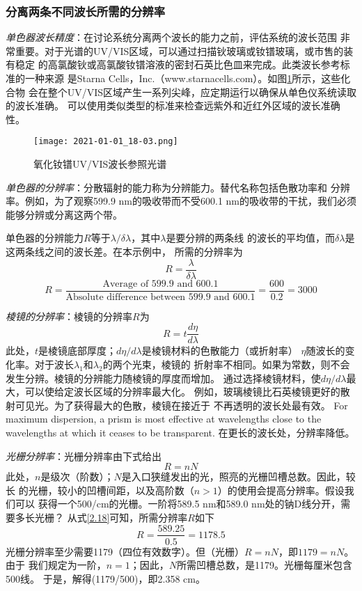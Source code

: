\subsubsection{分离两条不同波长所需的分辨率}
\emph{单色器波长精度}：在讨论系统分离两个波长的能力之前，评估系统的波长范围
非常重要。对于光谱的UV/VIS区域，可以通过扫描钬玻璃或钕镨玻璃，或市售的装有稳定
的高氯酸钬或高氯酸钕镨溶液的密封石英比色皿来完成。此类波长参考标准的一种来源
是Starna Cells，Inc.（www.starnacells.com）。如图\ref{fig:2.24}所示，这些化合物
会在整个UV/VIS区域产生一系列尖峰，应定期运行以确保从单色仪系统读取的波长准确。
可以使用类似类型的标准来检查远紫外和近红外区域的波长准确性。
\begin{figure}[htpb]
    \centering
    \texttt{[image: 2021-01-01\_18-03.png]}
    \caption{氧化钕镨UV/VIS波长参照光谱}
    \label{fig:2.24}
\end{figure}

\emph{单色器的分辨率}：分散辐射的能力称为分辨能力。替代名称包括色散功率和
分辨率。例如，为了观察599.9 nm的吸收带而不受600.1 nm的吸收带的干扰，我们必须
能够分辨或分离这两个带。

单色器的分辨能力$R$等于$\lambda /\delta\lambda$，其中$\lambda$是要分辨的两条线
的波长的平均值，而$\delta \lambda$是这两条线之间的波长差。在本示例中，
所需的分辨率为
\begin{equation}
    R=\frac{\lambda}{\delta\lambda}
    \label{2.18}
\end{equation}
\[
    R=\frac{\text{Average of 599.9 and 600.1}}
    {\text{Absolute difference between 599.9 and 600.1}}
    =\frac{600}{0.2}=3000
\]

\emph{棱镜的分辨率}：棱镜的分辨率$R$为
\begin{equation}
    R = t\frac{d\eta}{d\lambda}
    \label{2.19}
\end{equation}
此处，$t$是棱镜底部厚度；$d\eta/d\lambda$是棱镜材料的色散能力（或折射率）
$\eta$随波长的变化率。对于波长$\lambda_1$和$\lambda_2$的两个光束，棱镜的
折射率不相同。如果为常数，则不会发生分辨。棱镜的分辨能力随棱镜的厚度而增加。
通过选择棱镜材料，使$d\eta/d\lambda$最大，可以使给定波长区域的分辨率最大化。
例如，玻璃棱镜比石英棱镜更好的散射可见光。为了获得最大的色散，棱镜在接近于
不再透明的波长处最有效。
For maximum dispersion, a prism is most effective at wavelengths close to
the wavelengths at which it ceases to be transparent.
在更长的波长处，分辨率降低。

\emph{光栅分辨率}：光栅分辨率由下式给出
\begin{equation}
    R = nN
    \label{2.20}
\end{equation}
此处，$n$是级次（阶数）；$N$是入口狭缝发出的光，照亮的光栅凹槽总数。因此，较长
的光栅，较小的凹槽间距，以及高阶数（$n>1$）的使用会提高分辨率。假设我们可以
获得一个500/cm的光栅。一阶将589.5 nm和589.0 nm处的钠D线分开，需要多长光栅？
从式\ref{2.18}可知，所需分辨率$R$如下
\[
    R = \frac{589.25}{0.5}=1178.5
\]
光栅分辨率至少需要1179（四位有效数字）。但（光栅）$R=nN$，即$1179=nN$。由于
我们规定为一阶，$n=1$；因此，$N$所需凹槽总数，是1179。光栅每厘米包含500线。
于是，解得(1179/500)，即2.358 cm。

